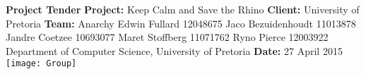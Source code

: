 \begin{titlepage}
	\begin{center}
		\large{\textbf{Project Tender}}\newline
		\vfill
		\LARGE{\textbf{Project:} Keep Calm and Save the Rhino}\newline
		\textbf{Client:} University of Pretoria\newline
		\vfill
		\LARGE{\textbf{Team:} Anarchy}\newline
		\large{Edwin Fullard 12048675}\newline
		\large{Jaco Bezuidenhoudt 11013878}\newline
		\large{Jandre Coetzee 10693077}\newline
		\large{Maret Stoffberg 11071762}\newline
		\large{Ryno Pierce 12003922}\newline
		\small{Department of Computer Science, University of Pretoria}\newline
		\vfill
		\large{\textbf{Date:} 27 April 2015}
		\vfill
		\texttt{[image: Group]}
	\end{center}
\end{titlepage}
